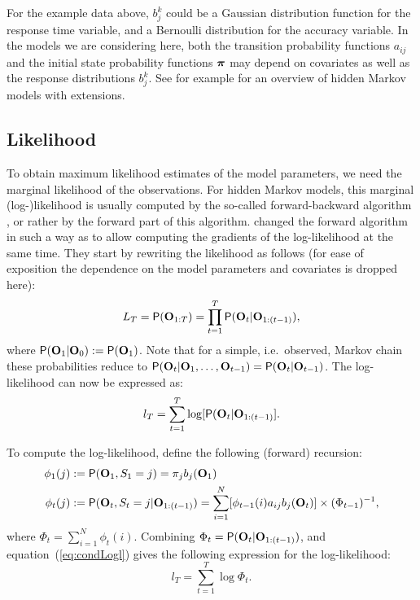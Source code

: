 \documentclass[article]{jss}
\newcommand{\vc}{\mathbf}
\newcommand{\greekv}[1]{\mbox{\boldmath$\mathrm{#1}$}}
\begin{document}
For the example data above, $b_j^k$ could be a Gaussian distribution
function for the response time variable, and a Bernoulli distribution for the
accuracy variable.  In the models we are considering here, both the
transition probability functions $a_{ij}$ and the initial state
probability functions $\greekv{\pi}$ may depend on covariates as well
as the response distributions $b_{j}^{k}$.  See for example
\citet{Fruhwirth2006} for an overview of hidden Markov models with
extensions.

\subsection{Likelihood}

To obtain maximum likelihood estimates of the model parameters, we need the
marginal likelihood of the observations. For hidden Markov models, this 
marginal (log-)likelihood is usually computed by the
so-called forward-backward algorithm \citep{Baum1966,Rabiner1989}, or
rather by the forward part of this algorithm. \cite{Lystig2002}
changed the forward algorithm in such a way as to allow computing the
gradients of the log-likelihood at the same time. They start by
rewriting the likelihood as follows (for ease of exposition the
dependence on the model parameters and covariates is dropped here):
\begin{equation}
	L_{T} = \Prob(\vc{O}_{1:T}) = \prod_{t=1}^{T} 
	\Prob(\vc{O}_{t}|\vc{O}_{1:(t-1)}), 
	\label{condLike}
\end{equation}
where $\Prob(\vc{O}_{1}|\vc{O}_{0}):=\Prob(\vc{O}_{1})$. Note that for a 
simple, i.e.\ observed, Markov chain these probabilities reduce to 
$\Prob(\vc{O}_{t}|\vc{O}_{1},\ldots, 
\vc{O}_{t-1})=\Prob(\vc{O}_{t}|\vc{O}_{t-1})$.
The log-likelihood can now be expressed as:
\begin{equation}
	l_{T} = \sum_{t=1}^{T} \log[\Prob(\vc{O}_{t}|\vc{O}_{1:(t-1)}].
	\label{eq:condLogl}
\end{equation}

To compute the log-likelihood, \cite{Lystig2002} define the following 
(forward) recursion:
\begin{align}
	\phi_{1}(j) &:= \Prob(\vc{O}_{1}, S_{1}=j) = \pi_{j} b_{j}(\vc{O}_{1}) 
	\label{eq:fwd1} \\
	\phi_{t}(j) &:= \Prob(\vc{O}_{t}, S_{t}=j|\vc{O}_{1:(t-1)}) %
	= \sum_{i=1}^{N} [\phi_{t-1}(i)a_{ij}b_{j}(\vc{O}_{t})] \times 
(\Phi_{t-1})^{-1},
	\label{eq:fwdt} 
\end{align}
where $\Phi_{t}=\sum_{i=1}^{N} \phi_{t}(i)$. Combining 
$\Phi_{t}=\Prob(\vc{O}_{t}|\vc{O}_{1:(t-1)})$, and 
equation~(\ref{eq:condLogl}) gives the following expression for the 
log-likelihood:
\begin{equation}
	l_{T} = \sum_{t=1}^{T} \log \Phi_{t}.
	\label{eq:logl}
\end{equation}
\end{document}
